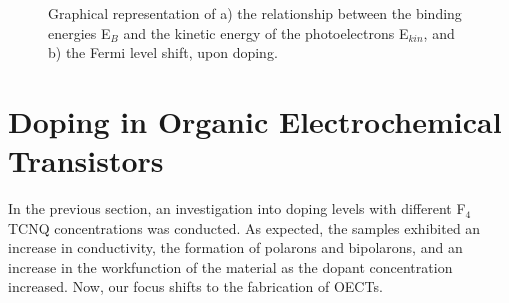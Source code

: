 \begin{figure}[ht]
	\centering
	\hspace{2em}
	\caption[Representation of the Fermi level shift upon doping]{ Graphical representation of a) the relationship between the binding energies E$_{B}$ and the kinetic energy of the photoelectrons E$_{kin}$, and b) the Fermi level shift, upon doping.} 
	\label{fig:ups}
\end{figure}


\section{Doping in Organic Electrochemical Transistors}
In the previous section, an investigation into doping levels with different F$_{4}$TCNQ concentrations was conducted. As expected, the samples exhibited an increase in conductivity, the formation of polarons and bipolarons, and an increase in the workfunction of the material as the dopant concentration increased. Now, our focus shifts to the fabrication of OECTs.

